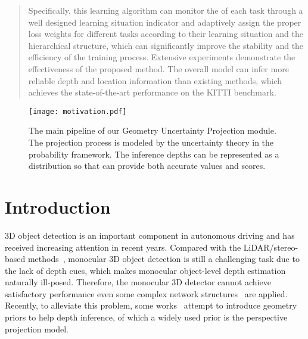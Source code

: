 \documentclass[10pt,twocolumn,letterpaper]{article}
\begin{document}
\begin{abstract}
Specifically, this learning algorithm can monitor the  of each task through a well designed learning situation indicator and adaptively assign the proper loss weights for different tasks according to their learning situation and the hierarchical structure, which can significantly improve the stability and the efficiency of the training process. 
Extensive experiments demonstrate the effectiveness of the proposed method.
The overall model can infer more reliable depth and location information than existing methods, which achieves the state-of-the-art performance on the KITTI benchmark.
\fi

\end{abstract}
 \begin{figure}[t]
\begin{center}
\texttt{[image: motivation.pdf]}
\end{center}
   \caption{The main pipeline of our Geometry Uncertainty Projection module. The projection process is modeled by the uncertainty theory in the probability framework. The inference depths can be represented as a distribution so that can provide both accurate values and scores.}
\label{fig:upm}
\end{figure}


\section{Introduction}




3D object detection is an important component in autonomous driving and has received increasing attention in recent years. 
Compared with the LiDAR/stereo-based methods~\cite{meyer2019lasernet,qi2019deep,qin2019triangulation,shi2019pointrcnn,shi2019part,yang2019std,yuan2021temporal}, monocular 3D object detection is still a challenging task due to the lack of depth cues, which makes monocular object-level depth estimation naturally ill-posed. Therefore, the monocular 3D detector cannot achieve satisfactory performance even some complex network structures~\cite{roddick2018orthographic} are applied. Recently, to alleviate this problem, some works~\cite{qin2019monogrnet,weng2019monocular} attempt to introduce geometry priors to help depth inference, of which a widely used prior is the perspective projection model. 
\end{document}
